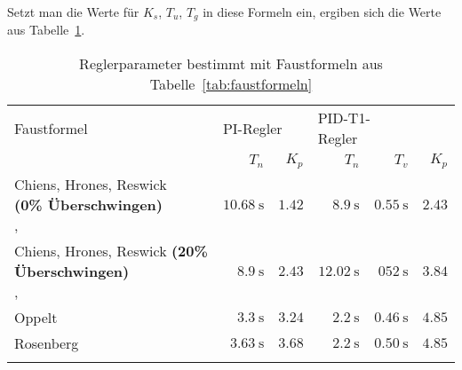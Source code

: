 \clearpage
Setzt man  die Werte f\"ur $K_s$,  $T_u$, $T_g$ in diese  Formeln ein, ergiben
sich die Werte aus Tabelle~\ref{tab:ff_results}.

\begin{longtable}{p{50mm}rrrrr}
    \toprule


    Faustformel
    &
    \multicolumn{2}{l}{PI-Regler}
    &
    \multicolumn{2}{l}{PID-T1-Regler}
    \\

    &
    $T_n$
    &
    $K_p$
    &
    $T_n$
    &
    $T_v$
    &
    $K_p$
    \\

    \midrule

    \endhead
    \endfoot
    \endlastfoot


    \pbox{45mm}{Chiens, Hrones, Reswick \\ \small{\textbf{(0\% \"Uberschwingen)}} \\ \cite{ref:chiens_tsn}, \cite{ref:chiens_wiki}}
    &
    $\SI{10.68}{\second}$
    &
    $1.42$
    &
    $\SI{8.9}{\second}$
    &
    $\SI{0.55}{\second}$
    &
    $2.43$
    \\

    \addlinespace[1em]

    \pbox{45mm}{Chiens, Hrones, Reswick \small{\textbf{(20\% \"Uberschwingen)}} \\ \cite{ref:chiens_tsn}, \cite{ref:chiens_wiki}}
    &
    $\SI{8.9}{\second}$
    &
    $2.43$
    &
    $\SI{12.02}{\second}$
    &
    $\SI{052}{\second}$
    &
    $3.84$
    \\

    \addlinespace[1em]

    Oppelt \cite{ref:op_ros_zieg}
    &
    $\SI{3.3}{\second}$
    &
    $3.24$
    &
    $\SI{2.2}{\second}$
    &
    $\SI{0.46}{\second}$
    &
    $4.85$
    \\

    \addlinespace[1em]

    Rosenberg \cite{ref:op_ros_zieg}
    &
    $\SI{3.63}{\second}$
    &
    $3.68$
    &
    $\SI{2.2}{\second}$
    &
    $\SI{0.50}{\second}$
    &
    $4.85$
    \\

    \addlinespace[1em]

    \bottomrule
    \caption{Reglerparameter bestimmt mit Faustformeln aus Tabelle~\ref{tab:faustformeln}}
\label{tab:ff_results}
\end{longtable}
